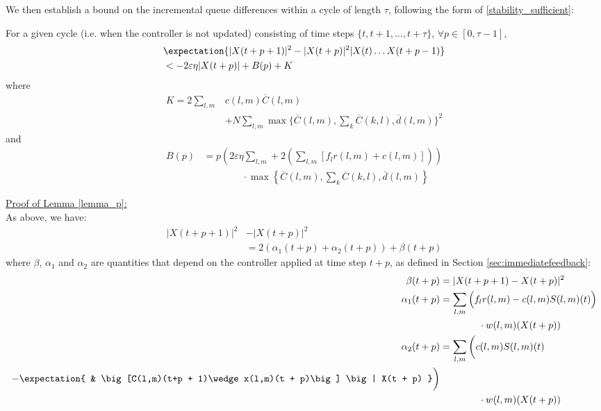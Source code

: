 \label{cycleproof}
We then establish a bound on the incremental queue differences within a cycle of length $\tau$, following the form of \eqref{stability_sufficient}: 
\begin{Lem} \label{lemma_p} 
For a given cycle (i.e. when the controller is not updated) consisting of time steps $\{t, t+1, \ldots,  t+\tau\}$,  $\forall p \in [0, \tau - 1 ]$, 
\begin{align} \nonumber 
&\expectation{\vert X(t + p + 1)\vert^2 - \vert X(t + p)\vert^2 \vert X(t) \ldots X(t + p - 1)} \\
&< -2\varepsilon \eta \vert X(t + p )\vert + B(p) + K \label{boundCycleMP}
\end{align}
where
\begin{align}  \label{Kdef}
K = 2 \sum_{l,m}&c(l,m)\overline{C}(l,m) \\ \nonumber 
& + N \sum_{l,m} \max\{ \overline{C}(l,m),\sum_{k}\overline{C}(k,l), \overline{d}(l,m) \} ^2
\end{align}
and
\begin{align} \nonumber 
B(p) &= p\left(2\varepsilon \eta  \sum_{l,m} + 2  (\sum_{l,m}[f_{l}r(l,m) + c(l,m)]) \right) \\
& \qquad \qquad \cdot \max\left\{ \overline{C}(l,m),\sum_{k}\overline{C}(k,l),\overline d(l,m) \right\} \label{Cpdef}
\end{align}
\end{Lem}
\underline{Proof of Lemma \ref{lemma_p}:} \\
As above, we have:
\begin{align} \label{immediate_to_bound} 
 |X(t+ p + 1)|^{2} &- |X(t + p)|^{2} \\  \nonumber
 & = 2(\alpha_1(t + p)+\alpha_2(t + p)) + \beta(t + p)   
\end{align}
where $\beta$, $\alpha_{1}$ and $\alpha_{2}$ are quantities that depend on the controller applied at time step $t + p$, as defined in Section \ref{sec:immediatefeedback}:
\begin{align*}
\beta (t+p)  &= \vert X(t + p + 1) - X(t + p) \vert^{2} \\
\alpha_{1} (t+p) &=  \sum_{l,m} \Big(f_{l}r(l,m) - c(l,m)S(l,m)(t)\Big)\\ 
& \qquad \qquad \cdot w(l,m)(X(t + p)) \\
 \alpha_{2}  (t+p)&= \sum_{l,m} \bigg(c(l,m)S(l,m)(t) \\ 
 - \expectation{ & \big[C(l,m)(t+p + 1)\wedge x(l,m)(t + p)\big] \big| X(t + p) }\bigg)\\
&\qquad \qquad \cdot w(l,m)(X(t + p))
 \end{align*}
